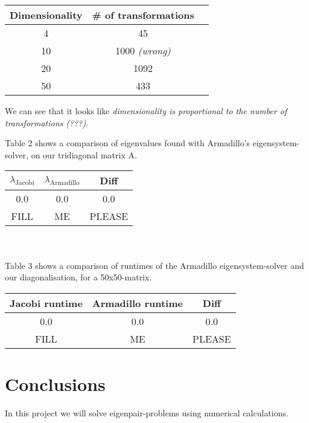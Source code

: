 \documentclass{article}
\begin{document}
	\begin{tabular}{c c c}
		Dimensionality & \# of transformations\\
		\hline
		4 & 45 \\
		10 & 1000 \textit{(wrong)} \\
		20 & 1092 \\
		50 & 433
	\end{tabular}

	We can see that it looks like \textit{dimensionality is proportional to the number of transformations (???)}.

	Table 2 shows a comparison of eigenvalues found with Armadillo's eigensystem-solver, on our tridiagonal matrix A.\\
	\begin{tabular}{c c c}
		$\lambda_{\text{Jacobi}}$ & $\lambda_{\text{Armadillo}}$ & Diff\\
		\hline
		0.0 & 0.0 & 0.0 \\
		FILL & ME & PLEASE
	\end{tabular} \\ \\

	Table 3 shows a comparison of runtimes of the Armadillo eigensystem-solver and our diagonalisation, for a 50x50-matrix.\\

	\begin{tabular}{c c c}
		Jacobi runtime & Armadillo runtime & Diff\\
		\hline
		0.0 & 0.0 & 0.0 \\
		FILL & ME & PLEASE
	\end{tabular}



\section{Conclusions}
	In this project we will solve eigenpair-problems using numerical calculations.
\end{document}
